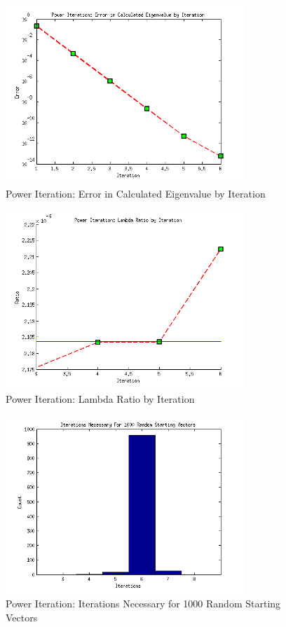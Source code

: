 \documentclass{article}
\begin{document}
\begin{figure}
\centering
\includegraphics[width=0.8\textwidth]{Problem1Figure1.png}
\caption{Power Iteration: Error in Calculated Eigenvalue by Iteration}
\label{p1f1}
\end{figure}

\begin{figure}
\centering
\includegraphics[width=0.8\textwidth]{Problem1Figure2.png}
\caption{Power Iteration: Lambda Ratio by Iteration}
\label{p1f2}
\end{figure}

\begin{figure}
\centering
\includegraphics[width=0.8\textwidth]{Problem1Figure3.png}
\caption{Power Iteration: Iterations Necessary for 1000 Random Starting Vectors}
\label{p1f3}
\end{figure}
\end{document}
